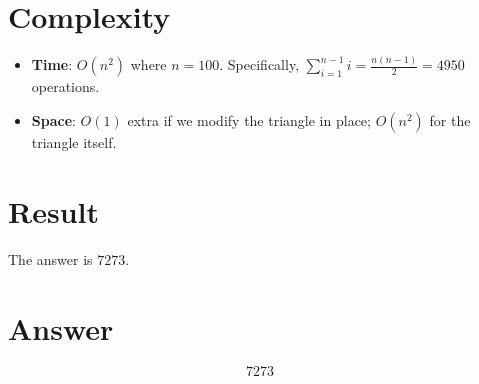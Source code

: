 \documentclass[12pt,a4paper]{article}
\begin{document}
\section{Complexity}

\begin{itemize}
    \item \textbf{Time}: $O(n^2)$ where $n = 100$. Specifically, $\sum_{i=1}^{n-1} i = \frac{n(n-1)}{2} = 4950$ operations.
    \item \textbf{Space}: $O(1)$ extra if we modify the triangle in place; $O(n^2)$ for the triangle itself.
\end{itemize}

\section{Result}

The answer is $\boxed{7273}$.

\section{Answer}

\[
\boxed{7273}
\]
\end{document}
